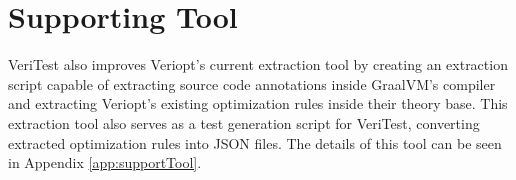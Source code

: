 \section{Supporting Tool}
\label{sec:Tool}

VeriTest also improves Veriopt's current extraction tool \cite[Sec. 7]{Term_Graph_Optimizations} by creating an extraction script capable of 
extracting source code annotations inside GraalVM's compiler and extracting Veriopt's existing optimization rules inside their theory base.
This extraction tool also serves as a test generation script for VeriTest, converting extracted optimization rules into JSON files. The details 
of this tool can be seen in Appendix \ref{app:supportTool}.